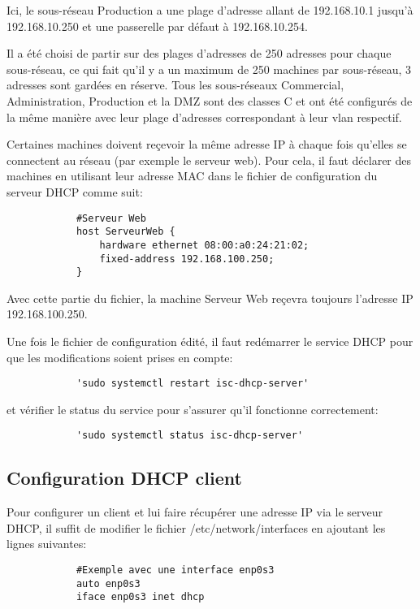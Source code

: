 \documentclass[a4paper,12pt]{report}
\begin{document}
\begin{itemize}
                
            Ici, le sous-réseau Production a une plage d'adresse allant de 192.168.10.1 jusqu'à 192.168.10.250 et une passerelle par défaut à 192.168.10.254.

            Il a été choisi de partir sur des plages d'adresses de 250 adresses pour chaque sous-réseau, ce qui fait qu'il y a un maximum de 250 machines par sous-réseau, 3 adresses sont gardées en réserve.
            Tous les sous-réseaux Commercial, Administration, Production et la DMZ sont des classes C et ont été configurés de la même manière avec leur plage d'adresses correspondant à leur vlan respectif.

            Certaines machines doivent reçevoir la même adresse IP à chaque fois qu'elles se connectent au réseau (par exemple le serveur web).
            Pour cela, il faut déclarer des machines en utilisant leur adresse MAC dans le fichier de configuration du serveur DHCP comme suit:

            \begin{verbatim}
            #Serveur Web
            host ServeurWeb {
                hardware ethernet 08:00:a0:24:21:02;
                fixed-address 192.168.100.250;
            }
            \end{verbatim}

            Avec cette partie du fichier, la machine Serveur Web reçevra toujours l'adresse IP 192.168.100.250.

            Une fois le fichier de configuration édité, il faut redémarrer le service DHCP pour que les modifications soient prises en compte:
            \begin{verbatim}
            'sudo systemctl restart isc-dhcp-server'
            \end{verbatim}
            et vérifier le status du service pour s'assurer qu'il fonctionne correctement:
            \begin{verbatim}
            'sudo systemctl status isc-dhcp-server'
            \end{verbatim}

            \subsection{Configuration DHCP client}
            Pour configurer un client et lui faire récupérer une adresse IP via le serveur DHCP, il suffit de modifier le fichier /etc/network/interfaces en ajoutant les lignes suivantes:
            \begin{verbatim}
            #Exemple avec une interface enp0s3
            auto enp0s3
            iface enp0s3 inet dhcp
            \end{verbatim}


\end{itemize}
\end{document}
